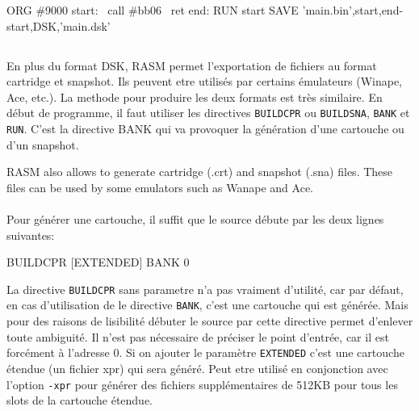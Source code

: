 \begin{code}
ORG \#9000
\medskip
start:
\ call \#bb06
\ ret
end:
\medskip
RUN start
SAVE 'main.bin',start,end-start,DSK,'main.dsk'

\end{code}





\subsection{}
\begin{xen}
\end{xen}
\begin{xfr}
\end{xfr}

\begin{xfr}
En plus du format DSK, RASM permet l'exportation de fichiers au format cartridge et snapshot. Ils peuvent etre utilisés par certains émulateurs (Winape, Ace, etc.). La methode pour produire les deux formats est très similaire. En début de programme, il faut utiliser les directives \texttt{BUILDCPR} ou \texttt{BUILDSNA}, \texttt{BANK} et \texttt{RUN}. C'est la directive BANK qui va provoquer la génération d'une cartouche ou d'un snapshot.
\end{xfr}

\begin{xen}
RASM also allows to generate cartridge (.crt) and snapshot (.sna) files. These files can be used by some emulators such as Wanape and Ace.
\end{xen}

\paragraph{}

\begin{xfr}
Pour générer une cartouche, il suffit que le source débute par les deux lignes suivantes:
\end{xfr}

\begin{code}
BUILDCPR [EXTENDED]
BANK 0
\end{code}

\begin{xfr}
La directive \texttt{BUILDCPR} sans parametre n'a pas vraiment d'utilité, car par défaut, en cas d'utilisation de le directive \texttt{BANK}, c'est une cartouche qui est générée. Mais pour des raisons de lisibilité débuter le source par cette directive permet d'enlever toute ambiguité.
Il n'est pas nécessaire de préciser le point d'entrée, car il est forcément à l'adresse 0.
Si on ajouter le paramètre \texttt{EXTENDED} c'est une cartouche étendue (un fichier xpr) qui sera généré.
Peut etre utilisé en conjonction avec l'option \texttt{-xpr} pour générer des fichiers supplémentaires de 512KB pour tous les slots de la cartouche étendue.
\end{xfr}

